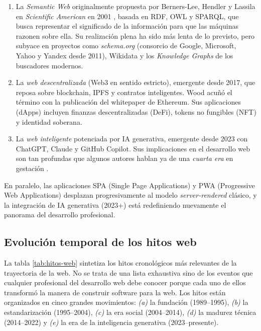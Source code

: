 \begin{enumerate}
\item La \emph{Semantic Web} originalmente propuesta por Berners-Lee,
Hendler y Lassila en \emph{Scientific American} en 2001
\cite{bernerslee2001semantic}, basada en RDF, OWL y SPARQL, que busca
representar el significado de la información para que las máquinas
razonen sobre ella. Su realización plena ha sido más lenta de lo
previsto, pero subyace en proyectos como \emph{schema.org} (consorcio
de Google, Microsoft, Yahoo y Yandex desde 2011), Wikidata y los
\emph{Knowledge Graphs} de los buscadores modernos.

\item La \emph{web descentralizada} (Web3 en sentido estricto),
emergente desde 2017, que reposa sobre blockchain, IPFS y contratos
inteligentes. Wood \cite{wood2014ethereum} acuñó el término con la
publicación del whitepaper de Ethereum. Sus aplicaciones (dApps)
incluyen finanzas descentralizadas (DeFi), tokens no fungibles (NFT)
y identidad soberana.

\item La \emph{web inteligente} potenciada por IA generativa,
emergente desde 2023 con ChatGPT, Claude y GitHub Copilot. Sus
implicaciones en el desarrollo web son tan profundas que algunos
autores hablan ya de una \emph{cuarta era} en gestación
\cite{kreutzer2024ai}.
\end{enumerate}

En paralelo, las aplicaciones SPA (Single Page Applications) y PWA
(Progressive Web Applications) desplazan progresivamente al modelo
\emph{server-rendered} clásico, y la integración de IA generativa
(2023+) está redefiniendo nuevamente el panorama del desarrollo
profesional.

\subsection{Evolución temporal de los hitos web}

La tabla \ref{tab:hitos-web} sintetiza los hitos cronológicos más
relevantes de la trayectoria de la web. No se trata de una lista
exhaustiva sino de los eventos que cualquier profesional del
desarrollo web debe conocer porque cada uno de ellos transformó la
manera de construir software para la web. Los hitos están organizados
en cinco grandes movimientos: \emph{(a)} la fundación
(1989--1995), \emph{(b)} la estandarización (1995--2004), \emph{(c)}
la era social (2004--2014), \emph{(d)} la madurez técnica
(2014--2022) y \emph{(e)} la era de la inteligencia generativa
(2023--presente).

